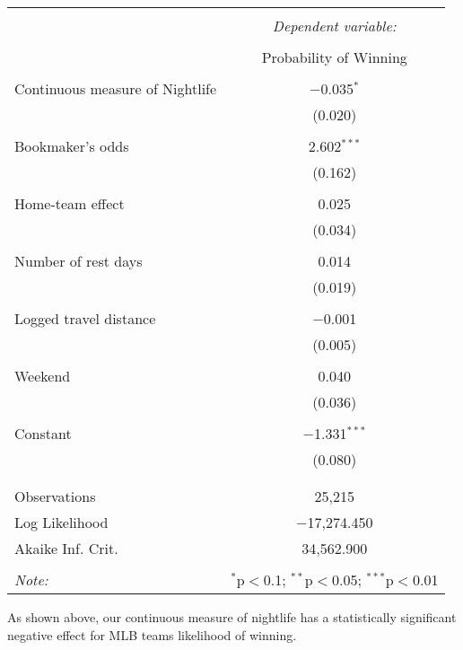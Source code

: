 \documentclass[letterpaper,12pt]{article}
\begin{document}
\begin{tabular}{@{\extracolsep{5pt}}lc}  \\[-1.8ex]\hline  \hline \\[-1.8ex]   & \multicolumn{1}{c}{\textit{Dependent variable:}} \\  \cline{2-2}  \\[-1.8ex] & Probability of Winning \\  \hline \\[-1.8ex]   Continuous measure of Nightlife & $-$0.035$^{*}$ \\    & (0.020) \\    & \\   Bookmaker's odds & 2.602$^{***}$ \\    & (0.162) \\    & \\   Home-team effect & 0.025 \\    & (0.034) \\    & \\   Number of rest days & 0.014 \\    & (0.019) \\    & \\   Logged travel distance & $-$0.001 \\    & (0.005) \\    & \\   Weekend & 0.040 \\    & (0.036) \\    & \\   Constant & $-$1.331$^{***}$ \\    & (0.080) \\    & \\  \hline \\[-1.8ex]  Observations & 25,215 \\  Log Likelihood & $-$17,274.450 \\  Akaike Inf. Crit. & 34,562.900 \\  \hline  \hline \\[-1.8ex]  \textit{Note:}  & \multicolumn{1}{r}{$^{*}$p$<$0.1; $^{**}$p$<$0.05; $^{***}$p$<$0.01} \\  \end{tabular} 


As shown above, our continuous measure of nightlife has a statistically significant negative effect for MLB teams likelihood of winning.
\end{document}
